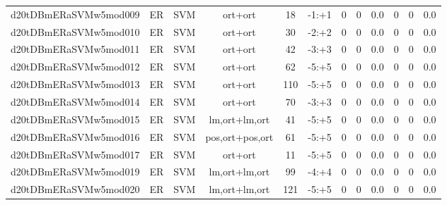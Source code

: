 \documentclass[a4paper]{article}
\begin{document}
\begin{landscape}
\begin{center}
\begin{tabular}{ |c|c|c|c|c|c|c|c|c|c|c|c|}
 
 	
 	\small{ d20tDBmERaSVMw5mod009 } & ER & SVM & ort+ort  &  18 &  -1:+1  &  0 & 0 & 0.0  &  0 & 0 & 0.0 \\
 	

 
 	
 	\small{ d20tDBmERaSVMw5mod010 } & ER & SVM & ort+ort  &  30 &  -2:+2  &  0 & 0 & 0.0  &  0 & 0 & 0.0 \\
 	

 
 	
 	\small{ d20tDBmERaSVMw5mod011 } & ER & SVM & ort+ort  &  42 &  -3:+3  &  0 & 0 & 0.0  &  0 & 0 & 0.0 \\
 	

 
 	
 	\small{ d20tDBmERaSVMw5mod012 } & ER & SVM & ort+ort  &  62 &  -5:+5  &  0 & 0 & 0.0  &  0 & 0 & 0.0 \\
 	

 
 	
 	\small{ d20tDBmERaSVMw5mod013 } & ER & SVM & ort+ort  &  110 &  -5:+5  &  0 & 0 & 0.0  &  0 & 0 & 0.0 \\
 	

 
 	
 	\small{ d20tDBmERaSVMw5mod014 } & ER & SVM & ort+ort  &  70 &  -3:+3  &  0 & 0 & 0.0  &  0 & 0 & 0.0 \\
 	

 
 	
 	\small{ d20tDBmERaSVMw5mod015 } & ER & SVM & lm,ort+lm,ort  &  41 &  -5:+5  &  0 & 0 & 0.0  &  0 & 0 & 0.0 \\
 	

 
 	
 	\small{ d20tDBmERaSVMw5mod016 } & ER & SVM & pos,ort+pos,ort  &  61 &  -5:+5  &  0 & 0 & 0.0  &  0 & 0 & 0.0 \\
 	

 
 	
 	\small{ d20tDBmERaSVMw5mod017 } & ER & SVM & ort+ort  &  11 &  -5:+5  &  0 & 0 & 0.0  &  0 & 0 & 0.0 \\
 	

 
 	
 	\small{ d20tDBmERaSVMw5mod019 } & ER & SVM & lm,ort+lm,ort  &  99 &  -4:+4  &  0 & 0 & 0.0  &  0 & 0 & 0.0 \\
 	

 
 	
 	\small{ d20tDBmERaSVMw5mod020 } & ER & SVM & lm,ort+lm,ort  &  121 &  -5:+5  &  0 & 0 & 0.0  &  0 & 0 & 0.0 \\
 	


\end{tabular}
\end{center}
\end{landscape}
\end{document}
